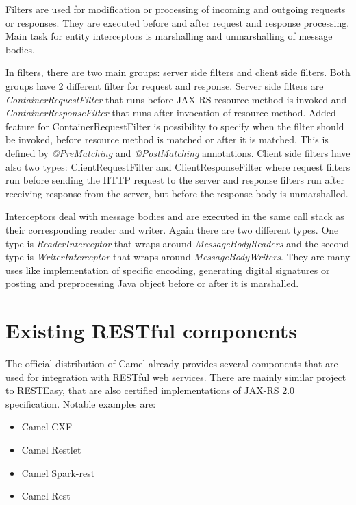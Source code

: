 \documentclass[12pt,final,oneside]{fithesis2}
\begin{document}
Filters are used for modification or processing of incoming and outgoing requests or responses. They are executed before and after request and response processing. Main task for entity interceptors is marshalling and unmarshalling of message bodies.

In filters, there are two main groups: server side filters and client side filters. Both groups have 2 different filter for request and response. Server side filters are \textit{ContainerRequestFilter} that runs before JAX-RS resource method is invoked and \textit{ContainerResponseFilter} that runs after invocation of resource method. Added feature for ContainerRequestFilter is possibility to specify when the filter should be invoked, before resource method is matched or after it is matched. This is defined by \textit{@PreMatching} and \textit{@PostMatching} annotations. Client side filters have also two types: ClientRequestFilter and ClientResponseFilter where request filters run before sending the HTTP request to the server and response filters run after receiving response from the server, but before the response body is unmarshalled. \cite{jax-rs-2.0}\cite{resteasy-book}

Interceptors deal with message bodies and are executed in the same call stack as their corresponding reader and writer. Again there are two different types. One type is \textit{ReaderInterceptor} that wraps around \textit{MessageBodyReaders} and the second type is \textit{WriterInterceptor} that wraps around \textit{MessageBodyWriters}. They are many uses like implementation of specific encoding, generating digital signatures or posting and preprocessing Java object before or after it is marshalled.\cite{jax-rs-2.0}




\section{Existing RESTful components}
The official distribution of Camel already provides several components that are used for integration with RESTful web services. There are mainly similar project to RESTEasy, that are also certified implementations of JAX-RS 2.0 specification. Notable examples are:
\begin{itemize}
\item
Camel CXF

\item
Camel Restlet

\item
Camel Spark-rest

\item
Camel Rest
\end{itemize}
\end{document}
